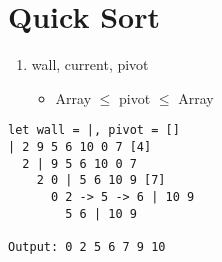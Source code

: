 \documentclass{article}
\begin{document}
\setcounter{section}{5}
\section{Quick Sort}
\begin{enumerate}
\item wall, current, pivot
    \begin{itemize}
    \item Array $\leq$ pivot $\leq$ Array
    \end{itemize}
\end{enumerate}

\begin{verbatim}
let wall = |, pivot = []
| 2 9 5 6 10 0 7 [4]
  2 | 9 5 6 10 0 7
    2 0 | 5 6 10 9 [7]
      0 2 -> 5 -> 6 | 10 9
        5 6 | 10 9

Output: 0 2 5 6 7 9 10
\end{verbatim}
\end{document}
